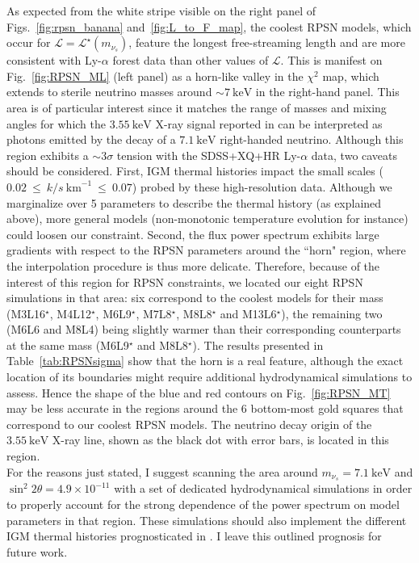 As expected from the white stripe visible on the right panel of Figs.~\ref{fig:rpsn_banana} and~\ref{fig:L_to_F_map}, the coolest RPSN models, which occur for $\mathcal{L} = \mathcal{L}^{\star}(m_{\nu_s})$, feature the longest free-streaming length and are more consistent with Ly-$\alpha$ forest data than other values of $\mathcal{L}$. This is manifest on Fig.~\ref{fig:RPSN_ML} (left panel) as a horn-like valley in the $\chi^2$ map, which extends to sterile neutrino masses around $\sim 7~\mathrm{keV}$ in the right-hand panel. This area  is of particular interest since it matches the range of masses and mixing angles for which the $3.55~\mathrm{keV}$ X-ray  signal reported in \cite{Bulbul14, Boyarsky14, Boyarsky2015}  can be interpreted as photons emitted by the decay of a $7.1~\mathrm{keV}$ right-handed neutrino. Although this region exhibits a $\sim3\sigma$ tension with the SDSS+XQ+HR Ly-$\alpha$ data, two  caveats should be considered. First,  IGM thermal histories impact the small scales ($0.02 ~\leq~ k / s~\mathrm{km}^{-1}~ \leq~ 0.07$) probed by these high-resolution data. Although we marginalize over 5 parameters to describe the thermal history  (as explained above), more general models (non-monotonic temperature evolution for instance) could loosen our constraint. Second, the flux power spectrum exhibits large gradients with respect to the RPSN parameters around the ``horn" region,  where the interpolation procedure is thus more delicate.
Therefore, because of the interest of this region for RPSN constraints, we located our eight RPSN simulations in that area: six correspond to the coolest models for their mass  (M3L16$^\star$, M4L12$^\star$, M6L9$^\star$, M7L8$^\star$, M8L8$^\star$ and M13L6$^\star$), the remaining two (M6L6 and M8L4) being slightly warmer than their corresponding counterparts at the same mass (M6L9$^\star$ and M8L8$^\star$). 
The results presented in Table~\ref{tab:RPSNsigma} show that the horn is a real feature,  although the exact location of its boundaries might require additional hydrodynamical simulations to assess. 
Hence the shape of the blue and red contours on Fig.~\ref{fig:RPSN_MT} may be less accurate  in the regions around the 6 bottom-most gold squares that correspond to our coolest RPSN models. 
The neutrino decay origin of the $3.55~\mathrm{keV}$ X-ray line, shown as the black dot with error bars, is located in this  region. \\

For the reasons just stated, I suggest scanning the  area  around  $m_{\nu_s} = 7.1  ~\mathrm{keV}$ and $\sin^2 2 \theta = 4.9 \times 10^{-11}$ with a set of dedicated hydrodynamical simulations in order to properly account for the strong dependence of the power spectrum on model parameters in that region. These simulations should also implement the different IGM thermal histories prognosticated in \cite{warmIGM}. I leave this outlined prognosis for future work.



